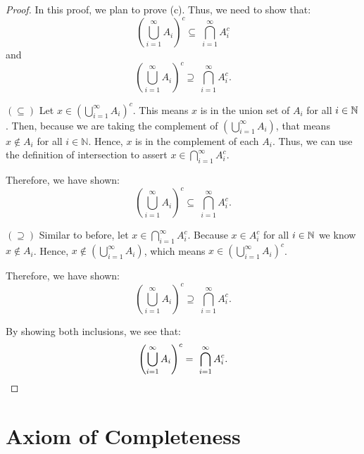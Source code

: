 \begin{customframedproof}[linecolor=horange!75]

    \begin{proof}
        In this proof, we plan to prove (c). Thus, we need to show that:
        \[
            \left( \bigcup_{i=1}^{\infty} A_i \right)^c \subseteq \ \bigcap_{i=1}^{\infty} A_i^c
        \]
        and
        \[
            \left( \bigcup_{i=1}^{\infty} A_i \right)^c \supseteq \ \bigcap_{i=1}^{\infty} A_i^c.
        \]
        \begin{proofpart}[horange]{\((\subseteq)\)}
            Let \(x \in \left( \bigcup_{i=1}^{\infty} A_i \right)^c\). This means \(x\) is in the union set of \(A_i\) for all \(i \in \mathbb{N}\). Then, because we are taking the complement of \(\left( \bigcup_{i=1}^{\infty} A_i \right)\), that means \(x \notin A_i\) for all \(i \in \mathbb{N}\). Hence, \(x\) is in the complement of each \(A_i\). Thus, we can use the definition of intersection to assert \(x \in \bigcap_{i=1}^{\infty} A_i^c\).

            Therefore, we have shown:
            \[
                \left( \bigcup_{i=1}^{\infty} A_i \right)^c \subseteq \ \bigcap_{i=1}^{\infty} A_i^c.
            \]
        \end{proofpart}
        \vspace{2mm}
        \begin{proofpart}[horange]{\((\supseteq)\)}
            Similar to before, let \(x \in \bigcap_{i=1}^{\infty} A_i^c\). Because \(x \in A^c_i\) for all \(i \in \mathbb{N}\) we know \(x \notin A_i\). Hence, \(x \notin \left(\bigcup_{i=1}^{\infty} A_i\right)\), which means \(x \in \left( \bigcup_{i=1}^{\infty} A_i \right)^c\).

            Therefore, we have shown:
            \[
                \left( \bigcup_{i=1}^{\infty} A_i \right)^c \supseteq \ \bigcap_{i=1}^{\infty} A_i^c.
            \]
        \end{proofpart}

        By showing both inclusions, we see that:
        \[
            \left( \bigcup_{i=1}^{\infty} A_i \right)^c = \ \bigcap_{i=1}^{\infty} A_i^c. \qedhere
        \] 
    \end{proof}
\end{customframedproof}



\setcounter{section}{2}
\renewcommand{\theenumi}{\arabic{enumi}}
\renewcommand{\labelenumi}{\theenumi.}
\section{Axiom of Completeness}


